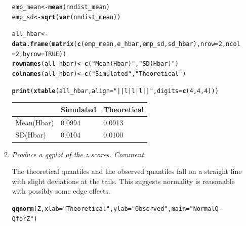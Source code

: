 \documentclass{article}\usepackage[]{graphicx}\usepackage[]{color}
\makeatletter
\newcommand{\hlnum}[1]{\textcolor[rgb]{0.686,0.059,0.569}{#1}}%
\newcommand{\hlstr}[1]{\textcolor[rgb]{0.192,0.494,0.8}{#1}}%
\newcommand{\hlstd}[1]{\textcolor[rgb]{0.345,0.345,0.345}{#1}}%
\newcommand{\hlkwb}[1]{\textcolor[rgb]{0.69,0.353,0.396}{#1}}%
\newcommand{\hlkwc}[1]{\textcolor[rgb]{0.333,0.667,0.333}{#1}}%
\newcommand{\hlkwd}[1]{\textcolor[rgb]{0.737,0.353,0.396}{\textbf{#1}}}%
\newenvironment{kframe}{%
 \def\at@end@of@kframe{}%
 \ifinner\ifhmode%
  \def\at@end@of@kframe{\end{minipage}}%
  \begin{minipage}{\columnwidth}%
 \fi\fi%
 \def\FrameCommand##1{\hskip\@totalleftmargin \hskip-\fboxsep
 \colorbox{shadecolor}{##1}\hskip-\fboxsep
     \hskip-\linewidth \hskip-\@totalleftmargin \hskip\columnwidth}%
 \MakeFramed {\advance\hsize-\width
   \@totalleftmargin\z@ \linewidth\hsize
   \@setminipage}}%
 {\par\unskip\endMakeFramed%
 \at@end@of@kframe}
\newenvironment{knitrout}{}{} %
\makeatother
\begin{document}
\begin{enumerate}
\begin{enumerate}
\begin{kframe}
\begin{alltt}
\hlstd{emp_mean} \hlkwb{<-} \hlkwd{mean}\hlstd{(nndist_mean)}
\hlstd{emp_sd} \hlkwb{<-} \hlkwd{sqrt}\hlstd{(}\hlkwd{var}\hlstd{(nndist_mean))}

\hlstd{all_hbar} \hlkwb{<-} \hlkwd{data.frame}\hlstd{(}\hlkwd{matrix}\hlstd{(}\hlkwd{c}\hlstd{(emp_mean, e_hbar, emp_sd, sd_hbar),} \hlkwc{nrow} \hlstd{=} \hlnum{2}\hlstd{,} \hlkwc{ncol} \hlstd{=} \hlnum{2}\hlstd{,} \hlkwc{byrow} \hlstd{=} \hlnum{TRUE}\hlstd{))}
\hlkwd{rownames}\hlstd{(all_hbar)} \hlkwb{<-} \hlkwd{c}\hlstd{(}\hlstr{"Mean(Hbar)"}\hlstd{,} \hlstr{"SD(Hbar)"}\hlstd{)}
\hlkwd{colnames}\hlstd{(all_hbar)} \hlkwb{<-} \hlkwd{c}\hlstd{(}\hlstr{"Simulated"}\hlstd{,} \hlstr{"Theoretical"}\hlstd{)}

\hlkwd{print}\hlstd{(}\hlkwd{xtable}\hlstd{(all_hbar,} \hlkwc{align} \hlstd{=} \hlstr{"||l|l|l||"}\hlstd{,}\hlkwc{digits}\hlstd{=}\hlkwd{c}\hlstd{(}\hlnum{4}\hlstd{,}\hlnum{4}\hlstd{,}\hlnum{4}\hlstd{)))}
\end{alltt}
\end{kframe}%
\begin{table}[ht]
\centering
\begin{tabular}{||l|l|l||}
  \hline
 & Simulated & Theoretical \\ 
  \hline
Mean(Hbar) & 0.0994 & 0.0913 \\ 
  SD(Hbar) & 0.0104 & 0.0100 \\ 
   \hline
\end{tabular}
\end{table}


\item %
{\it Produce a qqplot of the z scores. Comment.}

The theoretical quantiles and the observed quantiles fall on a straight line with slight deviations at the tails. This suggests normality is reasonable with possibly some edge effects.



\begin{knitrout}\footnotesize
{}\color{fgcolor}\begin{kframe}
\begin{alltt}
\hlkwd{qqnorm}\hlstd{(Z,} \hlkwc{xlab} \hlstd{=} \hlstr{"Theoretical"}\hlstd{,} \hlkwc{ylab} \hlstd{=} \hlstr{"Observed"}\hlstd{,} \hlkwc{main} \hlstd{=} \hlstr{"Normal Q-Q for Z"}\hlstd{)}
\end{alltt}
\end{kframe}


\end{knitrout}
\end{enumerate}
\end{enumerate}
\end{document}
